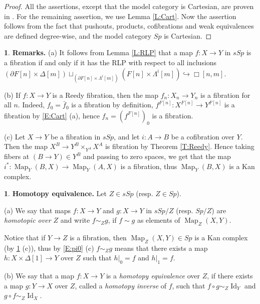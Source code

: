 \documentclass[12pt]{amsart}
\theoremstyle{plain}
\theoremstyle{definition}
\newtheorem{Emp}[Thm]{}
\numberwithin{equation}{section}
\newcommand{\La}{\Lambda}
\newcommand{\hra}{\hookrightarrow}
\newcommand{\Dt}{\Delta}
\newcommand{\rl}[1]{Lemma \ref{L:#1}}
\newcommand{\re}[1]{\ref{E:#1}}
\newcommand{\rt}[1] {Theorem \ref{T:#1}}
\newcommand{\Map}{\operatorname{Map}}
\newcommand{\p}{\partial}
\newcommand{\Id}{\operatorname{Id}}
\begin{document}
\begin{proof}
All the assertions, except that the model category is Cartesian,
are proven in \cite[IV,Thm 3.9]{GJ}. For the remaining assertion, we 
use \rl{Cart}. Now the assertion follows from the fact
that pushouts, products, cofibrations and weak equivalences are
defined degree-wise, and the model category $Sp$ is Cartesian.
\end{proof}

\begin{Emp} \label{E:rfib}
{\bf Remarks.} (a) It follows from \rl{RLP} that a map $f:X\to Y$
in $sSp$ is a fibration if and only if it has the RLP with respect
to all inclusions\\
$(\p F[n]\times\Dt[m])\sqcup_{(\p F[n]\times\La^i[m])}
(F[n]\times\La^i[m])\hra\Box[n,m]$.

(b) If $f:X\to Y$ is a Reedy fibration, then the map $f_n:X_n\to Y_n$ is a fibration for all $n$. 
Indeed, $f_0=\bar{f}_0$ is a fibration by definition, 
$f^{F[n]}:X^{F[n]}\to Y^{F[n]}$ is a fibration by \re{Cart} (a), hence $f_n=(f^{F[n]})_0$ is a fibration.  

(c) Let $X\to Y$ be a fibration in $sSp$, and let $i:A\to B$ be a
cofibration over $Y$. Then the map $X^B\to
Y^B\times_{Y^A} X^A$ is fibration by \rt{Reedy}. Hence taking fibers 
at $(B\to Y)\in Y^B$ and passing
to zero spaces, we get that the map 
$i^*:\Map_Y(B,X)\to\Map_Y(A,X)$ is a fibration, thus 
 $\Map_Y(B,X)$ is a Kan complex. 
\end{Emp}

\begin{Emp} \label{E:he}
{\bf Homotopy equivalence.} Let $Z\in sSp$ (resp. $Z\in Sp$).

(a) We say that maps $f:X\to Y$ and $g:X\to Y$ in $sSp/Z$ (resp.
$Sp/Z$) are {\em homotopic over $Z$} and write $f\sim_Z g$, if
$f\sim g$ as elements of $\Map_Z(X,Y)$.

Notice that if $Y\to Z$ is a fibration, then  $\Map_Z(X,Y)\in Sp$ is
a Kan complex (by \re{rfib} (c)), thus by \re{pi0} (c) $f\sim_Z g$
means that there exists a map $h:X\times \Dt[1]\to Y$ over $Z$ such that $h|_0=f$ and
$h|_1=f$.

(b) We say that a map $f:X\to Y$ is a {\em homotopy equivalence}
over $Z$, if there exists a map $g:Y\to X$ over $Z$, called a
{\em homotopy inverse} of $f$, such that $f\circ g\sim_Z\Id_Y$ and
$g\circ f\sim_Z\Id_X$.
\end{Emp}
\end{document}
